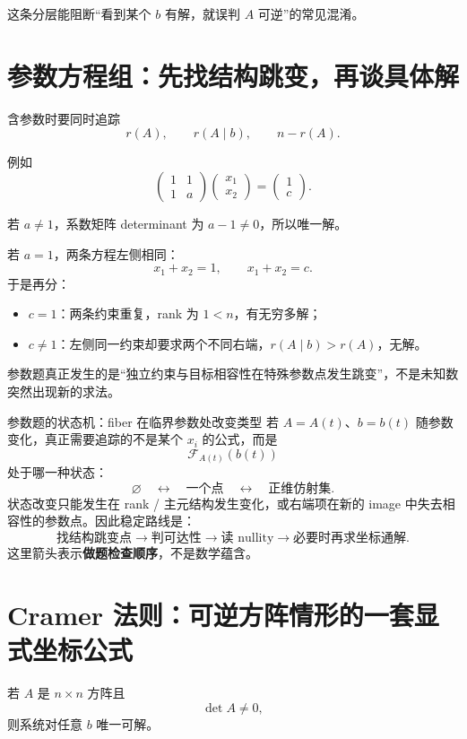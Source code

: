 \documentclass[11pt,a4paper]{ctexart}
\newcommand{\kw}[1]{\textbf{\color{deep}#1}}
\begin{document}
这条分层能阻断“看到某个 $b$ 有解，就误判 $A$ 可逆”的常见混淆。

\section{参数方程组：先找结构跳变，再谈具体解}

含参数时要同时追踪
\[
r(A),\qquad r(A\mid b),\qquad n-r(A).
\]

例如
\[
\begin{pmatrix}
1&1\\
1&a
\end{pmatrix}
\begin{pmatrix}x_1\\x_2\end{pmatrix}
=
\begin{pmatrix}1\\c\end{pmatrix}.
\]

若 $a\neq1$，系数矩阵 determinant 为 $a-1\neq0$，所以唯一解。

若 $a=1$，两条方程左侧相同：
\[
x_1+x_2=1,
\qquad
x_1+x_2=c.
\]
于是再分：
\begin{itemize}
  \item $c=1$：两条约束重复，rank 为 $1<n$，有无穷多解；
  \item $c\neq1$：左侧同一约束却要求两个不同右端，$r(A\mid b)>r(A)$，无解。
\end{itemize}

参数题真正发生的是“独立约束与目标相容性在特殊参数点发生跳变”，不是未知数突然出现新的求法。

\begin{corebox}{参数题的状态机：fiber 在临界参数处改变类型}
若 $A=A(t)$、$b=b(t)$ 随参数变化，真正需要追踪的不是某个 $x_i$ 的公式，而是
\[
\mathcal F_{A(t)}(b(t))
\]
处于哪一种状态：
\[
\boxed{\varnothing\quad\longleftrightarrow\quad\text{一个点}\quad\longleftrightarrow\quad\text{正维仿射集}.}
\]
状态改变只能发生在 rank / 主元结构发生变化，或右端项在新的 image 中失去相容性的参数点。因此稳定路线是：
\[
\text{找结构跳变点}
\to
\text{判可达性}
\to
\text{读 nullity}
\to
\text{必要时再求坐标通解}.
\]
这里箭头表示\kw{做题检查顺序}，不是数学蕴含。
\end{corebox}

\section{Cramer 法则：可逆方阵情形的一套显式坐标公式}

若 $A$ 是 $n\times n$ 方阵且
\[
\det A\neq0,
\]
则系统对任意 $b$ 唯一可解。
\end{document}
